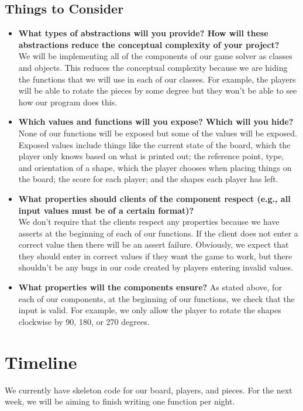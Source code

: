 \documentclass[11pt]{article}
\begin{document}
\subsection{Things to Consider}
\begin{itemize}
\item \textbf{What types of abstractions will you provide? How will these abstractions reduce the conceptual complexity of your project?}\\
We will be implementing all of the components of our game solver as classes and objects. This reduces the conceptual complexity because we are hiding the functions that we will use in each of our classes. For example, the players will be able to rotate the pieces by some degree but they won't be able to see how our program does this.
\item \textbf{Which values and functions will you expose? Which will you hide?}\\
None of our functions will be exposed but some of the values will be exposed. Exposed values include things like the current state of the board, which the player only knows based on what is printed out; the reference point, type, and orientation of a shape, which the player chooses when placing things on the board; the score for each player; and the shapes each player has left. 
\item \textbf{What properties should clients of the component respect (e.g., all input values must be of a certain format)?}\\
We don't require that the clients respect any properties because we have asserts at the beginning of each of our functions. If the client does not enter a correct value then there will be an assert failure. Obviously, we expect that they should enter in correct values if they want the game to work, but there shouldn't be any bugs in our code created by players entering invalid values. 
\item \textbf{What properties will the components ensure?}
As stated above, for each of our components, at the beginning of our functions, we check that the input is valid. For example, we only allow the player to rotate the shapes clockwise by 90, 180, or 270 degrees. 
\end{itemize}
\section{Timeline}

We currently have skeleton code for our board, players, and pieces. For the next week, we will be aiming to finish writing one function per night.
\end{document}

